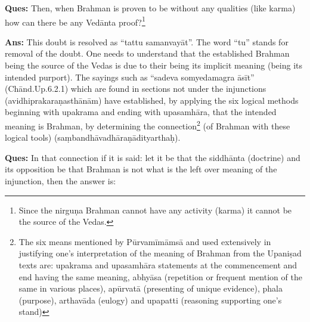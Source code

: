 \textbf{Ques:} Then, when Brahman is proven to be without any qualities (like karma) how can there be any Vedānta proof?\footnote{Since the nirguṇa Brahman cannot have any activity (karma) it cannot be the source of the Vedas.}

\textbf{Ans:} This doubt is resolved as “tattu samanvayāt”. The word “tu” stands for removal of the doubt. One needs to understand that the established Brahman being the source of the Vedas is due to their being its implicit meaning (being its intended purport). The sayings such as “sadeva somyedamagra āsīt” (Chānd.Up.6.2.1) which are found in sections not under the injunctions (avidhiprakaraṇasthānām) have established, by applying the six logical methods beginning with upakrama and ending with upasamhāra, that the intended meaning is Brahman, by determining the connection\footnote{The six means mentioned by Pūrvamīmāmsā and used extensively in justifying one’s interpretation of the meaning of Brahman from the Upaniṣad texts are: upakrama and upasamhāra statements at the commencement and end having the same meaning, abhyāsa (repetition or frequent mention of the same in various places), apūrvatā (presenting of unique evidence), phala (purpose), arthavāda (eulogy) and upapatti (reasoning supporting one’s stand)} (of Brahman with these logical tools) (saṃbandhāvadhāraṇādityarthaḥ).

\textbf{Ques:} In that connection if it is said: let it be that the siddhānta (doctrine) and its opposition be that Brahman is not what is the left over meaning of the injunction, then the answer is: 

